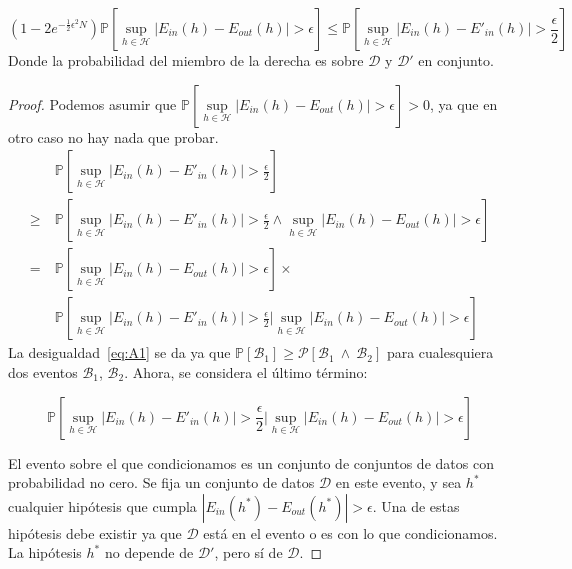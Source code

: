 \begin{lema}
  \label{lema:A2}
    \begin{displaymath}
        \left(1-2e^{- \frac{1}{2} \epsilon^2 N} \right)
        \mathbb{P} \left[ \sup_{h \in \mathcal{H}} | E_{in}(h) - E_{out}(h) | > \epsilon \right]
        \leq
        \mathbb{P} \left[ \sup_{h \in \mathcal{H}} | E_{in}(h) - E'_{in}(h) | > \frac{\epsilon}{2} \right]
    \end{displaymath}
Donde la probabilidad del miembro de la derecha es sobre $\mathcal{D}$ y
$\mathcal{D}'$ en conjunto.
\end{lema}

\begin{proof}
    Podemos asumir que $\mathbb{P} \left[ \sup\limits_{h \in \mathcal{H}} | E_{in}(h) - E_{out}(h) | > \epsilon \right] > 0$,
    ya que en otro caso no hay nada que probar.
    \begin{align}
        & \ \mathbb{P} \left[ \sup_{h \in \mathcal{H}} | E_{in}(h) - E'_{in}(h) | > \frac{\epsilon}{2} \right] \nonumber \\
        \geq & \ \mathbb{P} \left[ \sup_{h \in \mathcal{H}} | E_{in}(h) - E'_{in}(h) | > \frac{\epsilon}{2} \wedge
        \sup_{h \in \mathcal{H}} | E_{in}(h) - E_{out}(h) | > \epsilon \right] \label{eq:A1} \\
        =& \ \mathbb{P} \left[ \sup_{h \in \mathcal{H}} | E_{in}(h) - E_{out}(h) | > \epsilon \right] \times \nonumber \\
        & \ \mathbb{P} \left[ \sup_{h \in \mathcal{H}} | E_{in}(h) - E'_{in}(h) | > \frac{\epsilon}{2} \Big\vert
          \sup_{h \in \mathcal{H}} | E_{in}(h) - E_{out}(h) | > \epsilon \right] \nonumber
    \end{align}
    La desigualdad~\ref{eq:A1} se da ya que
    $\mathbb{P}[\mathcal{B}_1] \geq \mathcal{P} \left[ \mathcal{B}_1 \ \wedge
    \ \mathcal{B}_2 \right]$ para cualesquiera dos eventos
    $\mathcal{B}_1$, $\mathcal{B}_2$.
    Ahora, se considera el último término:


    \begin{displaymath}
        \mathbb{P} \left[ \sup_{h \in \mathcal{H}} | E_{in}(h) - E'_{in}(h) | > \frac{\epsilon}{2} \Big\vert
          \sup_{h \in \mathcal{H}} | E_{in}(h) - E_{out}(h) | > \epsilon \right]
    \end{displaymath}

    El evento sobre el que condicionamos es un conjunto de conjuntos de datos
    con probabilidad no cero. Se fija un conjunto de datos $\mathcal{D}$
    en este evento, y sea $h^*$ cualquier hipótesis que cumpla
    $ | E_{in}(h^*) - E_{out}(h^*) | > \epsilon $. Una de estas hipótesis debe
    existir ya que $\mathcal{D}$ está en el evento o es con lo que condicionamos.
    La hipótesis $h^*$ no depende de $\mathcal{D}'$, pero sí de $\mathcal{D}$.


\end{proof}

